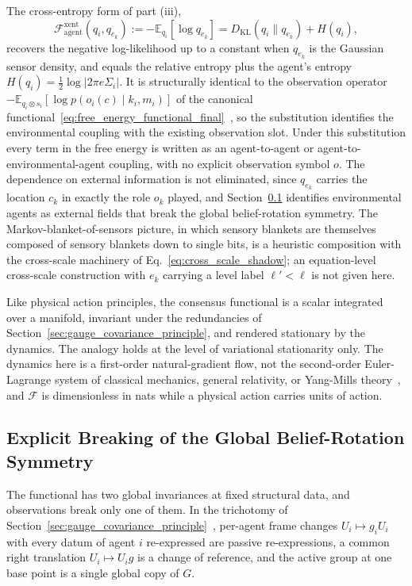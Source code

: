\documentclass[11pt]{article}
\begin{document}
The cross-entropy form of part (iii),
\begin{equation}
\mathcal{F}_{\text{agent}}^{\mathrm{xent}}(q_i, q_{e_k}) := -\mathbb{E}_{q_i}[\log q_{e_k}] = D_{\mathrm{KL}}(q_i \| q_{e_k}) + H(q_i),
\label{eq:xent_resolution}
\end{equation}
recovers the negative log-likelihood up to a constant when $q_{e_k}$ is the Gaussian sensor density, and equals the relative entropy plus the agent's entropy $H(q_i) = \tfrac{1}{2}\log|2\pi e \Sigma_i|$. It is structurally identical to the observation operator $-\mathbb{E}_{q_i\otimes s_i}[\log p(o_i(c)\mid k_i, m_i)]$ of the canonical functional~\eqref{eq:free_energy_functional_final}~\cite{Friston2010, parr2022active}, so the substitution identifies the environmental coupling with the existing observation slot. Under this substitution every term in the free energy is written as an agent-to-agent or agent-to-environmental-agent coupling, with no explicit observation symbol $o$. The dependence on external information is not eliminated, since $q_{e_k}$ carries the location $c_k$ in exactly the role $o_k$ played, and Section~\ref{sec:symmetry_breaking} identifies environmental agents as external fields that break the global belief-rotation symmetry. The Markov-blanket-of-sensors picture, in which sensory blankets are themselves composed of sensory blankets down to single bits, is a heuristic composition with the cross-scale machinery of Eq.~\eqref{eq:cross_scale_shadow}; an equation-level cross-scale construction with $e_k$ carrying a level label $\ell' < \ell$ is not given here.

Like physical action principles, the consensus functional is a scalar integrated over a manifold, invariant under the redundancies of Section~\ref{sec:gauge_covariance_principle}, and rendered stationary by the dynamics. The analogy holds at the level of variational stationarity only. The dynamics here is a first-order natural-gradient flow, not the second-order Euler-Lagrange system of classical mechanics, general relativity, or Yang-Mills theory~\cite{Yang1954}, and $\mathcal{F}$ is dimensionless in nats while a physical action carries units of action.

\subsection{Explicit Breaking of the Global Belief-Rotation Symmetry}
\label{sec:symmetry_breaking}

The functional has two global invariances at fixed structural data, and observations break only one of them. In the trichotomy of Section~\ref{sec:gauge_covariance_principle}~\cite[Ch.~2]{DennisGaugeVFE2026}, per-agent frame changes $U_i \mapsto g_i U_i$ with every datum of agent $i$ re-expressed are passive re-expressions, a common right translation $U_i \mapsto U_i g$ is a change of reference, and the active group at one base point is a single global copy of $G$.
\end{document}
